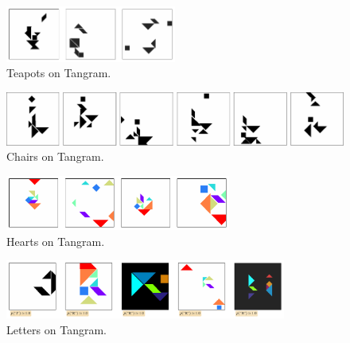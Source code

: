 \begin{figure}[H]
    \centering
    \includegraphics[width=0.5\textwidth]{images/curation_teapot_all.pdf}
    \caption{Teapots on Tangram.}
    \label{fig:curation_teapot}
\end{figure}

\begin{figure}[H]
    \centering
    \includegraphics[width=\textwidth]{images/curation_chair_cropped.pdf}
    \caption{Chairs on Tangram.}
    \label{fig:curation_chair}
\end{figure}

\begin{figure}[H]
    \centering
    \includegraphics[width=0.66\textwidth]{images/curation_heart.pdf}
    \caption{Hearts on Tangram.}
    \label{fig:curation_heart}
\end{figure}

\begin{figure}[H]
    \centering
    \includegraphics[width=0.824\textwidth]{images/curation_letters.pdf}
    \caption{Letters on Tangram.}
    \label{fig:curation_letters}
\end{figure}

